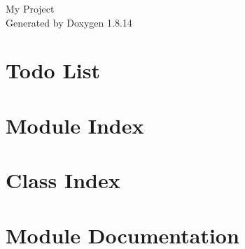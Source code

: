 \documentclass[twoside]{book}
\newcommand{\+}{\discretionary{\mbox{\scriptsize$\hookleftarrow$}}{}{}}
\newcommand{\clearemptydoublepage}{%
  \newpage{\pagestyle{empty}\cleardoublepage}%
}
\begin{document}
\hypersetup{pageanchor=false,
             bookmarksnumbered=true,
             pdfencoding=unicode
            }
\begin{titlepage}
\vspace*{7cm}
\begin{center}%
{\Large My Project }\\
\vspace*{1cm}
{\large Generated by Doxygen 1.8.14}\\
\end{center}
\end{titlepage}
\clearemptydoublepage
{}
\tableofcontents
\clearemptydoublepage
{}
\hypersetup{pageanchor=true}

\chapter{Todo List}
\label{todo}

\chapter{Module Index}

\chapter{Class Index}

\chapter{Module Documentation}
























\end{document}
